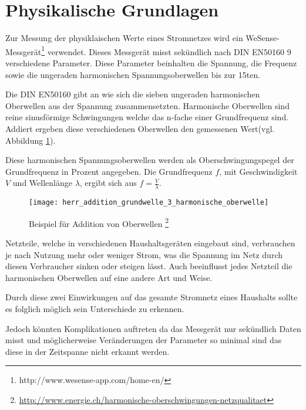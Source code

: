 \section{Physikalische Grundlagen} \label{physikalischeGrundlagen}
    Zur Messung der physiklaischen Werte eines Stromnetzes wird ein WeSense-Messgerät\footnote{http://www.wesense-app.com/home-en/} verwendet.
    Dieses Messgerät misst sekündlich nach DIN EN50160\cite{WesenseManual} 9 verschiedene Parameter.
    Diese Parameter beinhalten die Spannung, die Frequenz sowie die ungeraden harmonischen Spannungsoberwellen bis zur 15ten\cite[S.2, Kapitel 1.2]{WesenseManual}.
    \newline

    Die DIN EN50160\cite{EN50160} gibt an wie sich die sieben ungeraden harmonischen Oberwellen aus der Spannung zusammensetzten.
    Harmonische Oberwellen sind reine sinusförmige Schwingungen welche das n-fache einer Grundfrequenz sind.
    Addiert ergeben diese verschiedenen Oberwellen den gemessenen Wert(vgl. Abbildung \ref{fig:AddierteOberwwellen}).

    Diese harmonischen Spannungsoberwellen werden als Oberschwingungspegel der Grundfrequenz in Prozent angegeben.
    Die Grundfrequenz \( f \), mit Geschwindigkeit \( V \) und Wellenlänge \( \lambda \), ergibt sich aus \( f = \frac{V}{\lambda} \).

    \begin{figure}[H]
        \centering
        \texttt{[image: herr\_addition\_grundwelle\_3\_harmonische\_oberwelle]}
        \caption[Addition von Oberwellen]{Beispiel für Addition von Oberwellen \footnote{\url{http://www.energie.ch/harmonische-oberschwingungen-netzqualitaet}} }
        \label{fig:AddierteOberwwellen}
    \end{figure}

    Netzteile, welche in verschiedenen Haushaltsgeräten eingebaut sind, verbrauchen je nach Nutzung mehr oder weniger Strom, was die Spannung im Netz durch diesen Verbraucher sinken oder steigen lässt.
    Auch beeinflusst jedes Netzteil die harmonischen Oberwellen auf eine andere Art und Weise.
    
    Durch diese zwei Einwirkungen auf das gesamte Stromnetz eines Haushalts sollte es folglich möglich sein Unterschiede zu erkennen.
    
    Jedoch könnten Komplikationen auftreten da das Messgerät nur sekündlich Daten misst und möglicherweise Veränderungen der Parameter so minimal sind das diese in der Zeitspanne nicht erkannt werden. 

